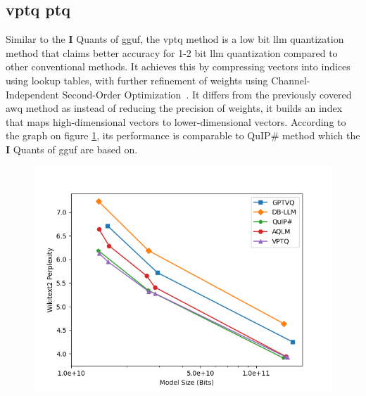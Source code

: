 \documentclass{ifacconf}
\begin{document}
	\subsection{\gls{vptq} \gls{ptq}}
	
	Similar to the \textbf{I} Quants of \gls{gguf}, the \gls{vptq} method is a low bit \gls{llm} quantization method that claims better accuracy for 1-2 bit \gls{llm} quantization compared to other conventional methods. It achieves this by compressing vectors into indices using lookup tables, with further refinement of weights using Channel-Independent Second-Order Optimization~\cite{liu2024vptqextremelowbitvector}. It differs from the previously covered \gls{awq} method as instead of reducing the precision of weights, it builds an index that maps high-dimensional vectors to lower-dimensional vectors. According to the graph on figure \ref{fig:vptq}, its performance is comparable to QuIP\# method which the \textbf{I} Quants of \gls{gguf} are based on.
	
	\begin{figure}[h]
		\includegraphics[width=1.1\linewidth]{vptq}
		\label{fig:vptq}
	\end{figure}
	
\end{document}
